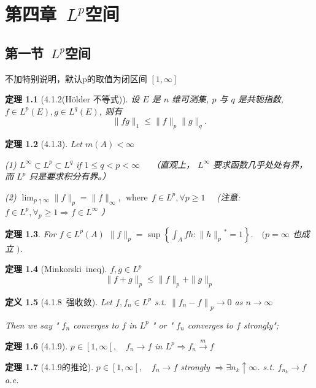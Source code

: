 \documentclass[10pt,openany]{book}
\theoremstyle{thmstyle} %
\newtheorem{theorem}{定理}[chapter]
\theoremstyle{defstyle} %
\newtheorem{definition}[theorem]{定义}
\theoremstyle{prostyle} %
\begin{document}
\chapter{第四章~$L^p$空间}

\section{第一节~$L^p$空间}

不加特别说明，默认p的取值为闭区间 $[1, \infty]$

\begin{theorem}[4.1.2(Hölder 不等式)]
设 $E$ 是 $n$ 维可测集, $p$ 与 $q$ 是共轭指数, $f \in L^p(E), g \in L^q(E)$, 则有
$$
\|f g\|_1 \leq\|f\|_p\|g\|_q .
$$
\end{theorem}

\begin{theorem}[4.1.3]
Let $m(A)<\infty$ 

(1) $L^{\infty} \subset L^p \subset L^q$ if $1 \leq q<p<\infty \quad$ （直观上， $L^{\infty}$ 要求函数几乎处处有界，而 $L^p$ 只是要求积分有界。）

(2) $\lim_{p \uparrow \infty}\|f\|_p=\|f\|_{\infty},~~ \text{where} ~~ f \in L^p, \forall p \geqslant 1 \quad$ (注意: $f \in L^p, \forall_p \geqslant 1 \Rightarrow f \in L^{\infty}$ ）
\end{theorem}

\begin{theorem}
For $f \in L^p(A)$
$\|f\|_p=\sup \left\{\int_A f h:\|h\|_p{ }^*=1\right\} . \quad(p=\infty$ 也成立 $)$.
\end{theorem}

\begin{theorem}[Minkorski~ineq] 
$f,g \in L^p$
$$
\|f+g\|_p \leqslant\|f\|_p+\|g\|_p
$$
\end{theorem}


\begin{definition}[4.1.8~强收敛]
Let $f, f_n \in L^p$ s.t. $\left\|f_n-f\right\|_p \rightarrow 0$ as $n \rightarrow \infty$

Then we say " $f_n$ converges to $f$ in $L^p$ " or " $f_n$ converges to $f$ strongly";
\end{definition}

\begin{theorem}[4.1.9]
$p \in\left[1, \infty\left[, \quad f_n \rightarrow f\right.\right.$ in $L^p \Rightarrow f_n \xrightarrow{m} f$
\end{theorem}

\begin{theorem}[4.1.9的推论]
$p \in\left[1, \infty\left[, \quad f_n \rightarrow f\right.\right.$ strongly $\Rightarrow \exists n_k \uparrow \infty$. s.t. $f_{n_k} \rightarrow f$ a.e.
\end{theorem}
\end{document}
